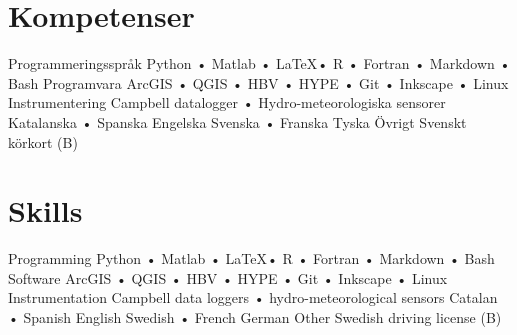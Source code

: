 \ifswedish
  \section{Kompetenser}
    \skill
      {Programmeringsspråk}
      {Python • Matlab • \LaTeX • R • Fortran • Markdown • Bash}
    \skill
      {Programvara}
      {ArcGIS • QGIS • HBV • HYPE • Git • Inkscape • Linux}
    \skill
      {Instrumentering}
      {Campbell datalogger • Hydro-meteorologiska sensorer}
    \languages
      {Katalanska • Spanska}
      {Engelska}
      {Svenska • Franska}
      {Tyska}
    \skill
      {Övrigt}
      {Svenskt körkort (B)}
\else
  \section{Skills}
    \skill
      {Programming}
      {Python • Matlab • \LaTeX • R • Fortran • Markdown • Bash}
    \skill
      {Software}
      {ArcGIS • QGIS • HBV • HYPE • Git • Inkscape • Linux}
    \skill
      {Instrumentation}
      {Campbell data loggers • hydro-meteorological sensors}
    \languages
      {Catalan • Spanish}
      {English}
      {Swedish • French}
      {German}
    \skill
      {Other}
      {Swedish driving license (B)}
\fi
